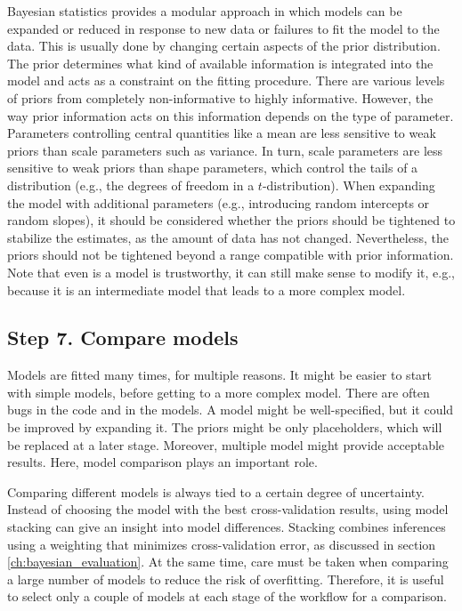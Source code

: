 Bayesian statistics provides a modular approach in which models can be expanded or reduced in response to new data or failures to fit the model to the data.
This is usually done by changing certain aspects of the prior distribution.
The prior determines what kind of available information is integrated into the model and acts as a constraint on the fitting procedure.
There are various levels of priors from completely non-informative to highly informative.
However, the way prior information acts on this information depends on the type of parameter.
Parameters controlling central quantities like a mean are less sensitive to weak priors than scale parameters such as variance.
In turn, scale parameters are less sensitive to weak priors than shape parameters, which control the tails of a distribution (e.g., the degrees of freedom in a $t$-distribution).
When expanding the model with additional parameters (e.g., introducing random intercepts or random slopes), it should be considered whether the priors should be tightened to stabilize the estimates, as the amount of data has not changed.
Nevertheless, the priors should not be tightened beyond a range compatible with prior information.
Note that even is a model is trustworthy, it can still make sense to modify it, e.g., because it is an intermediate model that leads to a more complex model.

\subsection{Step 7. Compare models}

Models are fitted many times, for multiple reasons.
It might be easier to start with simple models, before getting to a more complex model. There are often bugs in the code and in the models.
A model might be well-specified, but it could be improved by expanding it.
The priors might be only placeholders, which will be replaced at a later stage.
Moreover, multiple model might provide acceptable results.
Here, model comparison plays an important role.

Comparing different models is always tied to a certain degree of uncertainty.
Instead of choosing the model with the best cross-validation results, using model stacking can give an insight into model differences.
Stacking combines inferences using a weighting that minimizes cross-validation error, as discussed in section \ref{ch:bayesian_evaluation}.
At the same time, care must be taken when comparing a large number of models to reduce the risk of overfitting.
Therefore, it is useful to select only a couple of models at each stage of the workflow for a comparison.
